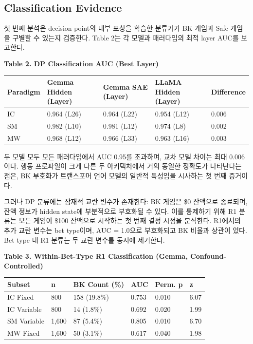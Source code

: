 \documentclass[11pt,a4paper]{article}
\begin{document}
\subsection{Classification Evidence}

첫 번째 분석은 decision point의 내부 표상을 학습한 분류기가 BK 게임과 Safe 게임을 구별할 수 있는지 검증한다. Table 2는 각 모델과 패러다임의 최적 layer AUC를 보고한다.

\textbf{Table 2. DP Classification AUC (Best Layer)}

\begin{table}[H]
\centering
\small
\begin{tabular}{|l|l|l|l|l|}
\hline
Paradigm & Gemma Hidden (Layer) & Gemma SAE (Layer) & LLaMA Hidden (Layer) & Difference \\
\hline
IC & 0.964 (L26) & 0.964 (L22) & 0.954 (L12) & 0.006 \\
SM & 0.982 (L10) & 0.981 (L12) & 0.974 (L8) & 0.002 \\
MW & 0.968 (L12) & 0.966 (L33) & 0.963 (L16) & 0.003 \\
\hline
\end{tabular}
\end{table}

두 모델 모두 모든 패러다임에서 AUC 0.95를 초과하며, 교차 모델 차이는 최대 0.006이다. 행동 프로파일이 크게 다른 두 아키텍처에서 거의 동일한 정확도가 나타난다는 점은, BK 부호화가 트랜스포머 언어 모델의 일반적 특성임을 시사하는 첫 번째 증거이다.

그러나 DP 분류에는 잠재적 교란 변수가 존재한다: BK 게임은 \$0 잔액으로 종료되며, 잔액 정보가 hidden state에 부분적으로 부호화될 수 있다. 이를 통제하기 위해 R1 분류는 모든 게임이 \$100 잔액으로 시작하는 첫 번째 결정 시점을 분석한다. R1에서의 추가 교란 변수는 bet type이며, AUC = 1.0으로 부호화되고 BK 비율과 상관이 있다. Bet type 내 R1 분류는 두 교란 변수를 동시에 제거한다.

\textbf{Table 3. Within-Bet-Type R1 Classification (Gemma, Confound-Controlled)}

\begin{table}[H]
\centering
\small
\begin{tabular}{|l|l|l|l|l|l|}
\hline
Subset & n & BK Count (\%) & AUC & Perm. p & z \\
\hline
IC Fixed & 800 & 158 (19.8\%) & 0.753 & 0.010 & 6.07 \\
IC Variable & 800 & 14 (1.8\%) & 0.692 & 0.020 & 1.99 \\
SM Variable & 1,600 & 87 (5.4\%) & 0.805 & 0.010 & 6.70 \\
MW Fixed & 1,600 & 50 (3.1\%) & 0.617 & 0.040 & 1.98 \\
\hline
\end{tabular}
\end{table}
\end{document}
